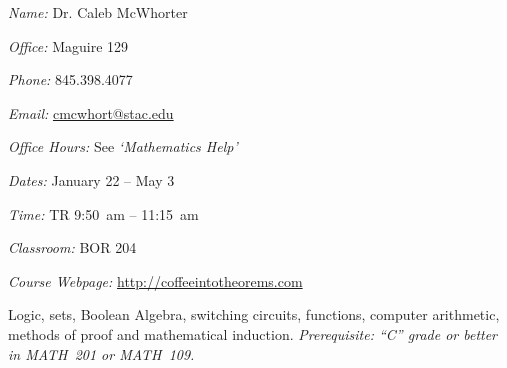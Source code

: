 \documentclass[11pt,letterpaper]{article}
\makeatletter
\newcommand{\classdates}{January 22 -- May 3}
\newcommand{\classtimes}{TR 9:50~am -- 11:15~am}
\newcommand{\classroom}{BOR 204}
\newcommand{\instructor}{Dr. Caleb McWhorter}
\newcommand{\office}{Maguire 129}
\newcommand{\phone}{845.398.4077}
\newcommand{\email}{cmcwhort@stac.edu}
\newcommand{\website}{http://coffeeintotheorems.com}
\newcommand{\officehours}{See \textit{`Mathematics Help'}}
\makeatother
\begin{document}




\textit{Name:} \instructor \par
\textit{Office:} \office \par
\textit{Phone:} \phone \par
\textit{Email:} \href{mailto:\email}{\email} \par
\textit{Office Hours:} \officehours 
\pspace



\textit{Dates:} \classdates \par
\textit{Time:} \classtimes \par
\textit{Classroom:} \classroom \par
\textit{Course Webpage:} \href{\website}{\website}
\sectionbreak





\newpage




Logic, sets, Boolean Algebra, switching circuits, functions, computer arithmetic, methods of proof and mathematical induction. {\itshape Prerequisite: ``C'' grade or better in MATH~201 or MATH~109.} \pspace
\end{document}
